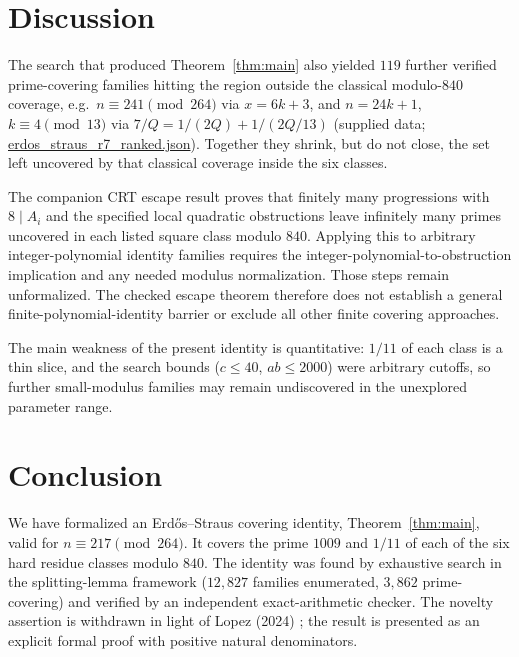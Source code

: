 \documentclass[11pt,a4paper]{article}
\theoremstyle{definition}
\begin{document}
\section{Discussion}

The search that produced Theorem~\ref{thm:main} also yielded $119$ further
verified prime-covering families hitting the region outside the classical
modulo-$840$ coverage, e.g.\
$n \equiv 241 \pmod{264}$ via $x = 6k+3$, and $n = 24k+1$, $k \equiv 4
\pmod{13}$ via $7/Q = 1/(2Q) + 1/(2Q/13)$ (supplied data;
\url{erdos_straus_r7_ranked.json}). Together they shrink, but do not
close, the set left uncovered by that classical coverage inside the six classes.

The companion CRT escape result proves that finitely many progressions
with $8\mid A_i$ and the specified local quadratic obstructions leave
infinitely many primes uncovered in each listed square class modulo $840$.
Applying this to arbitrary integer-polynomial identity families requires
the integer-polynomial-to-obstruction implication and any needed modulus
normalization. Those steps remain unformalized. The checked escape theorem
therefore does not establish a general finite-polynomial-identity barrier
or exclude all other finite covering approaches.

The main weakness of the present identity is quantitative: $1/11$ of each
class is a thin slice, and the search bounds ($c \leq 40$, $ab \leq 2000$)
were arbitrary cutoffs, so further small-modulus families may remain
undiscovered in the unexplored parameter range.

\section{Conclusion}

We have formalized an Erd\H{o}s--Straus covering identity,
Theorem~\ref{thm:main}, valid for $n \equiv 217 \pmod{264}$. It covers the
prime $1009$ and $1/11$ of each of the six hard residue classes modulo
$840$. The identity was found by exhaustive search in the splitting-lemma
framework ($12{,}827$ families enumerated, $3{,}862$ prime-covering) and
verified by an independent exact-arithmetic checker. The novelty assertion
is withdrawn in light of Lopez (2024) \cite{lopez2024}; the result is
presented as an explicit formal proof with positive natural denominators.
\end{document}
